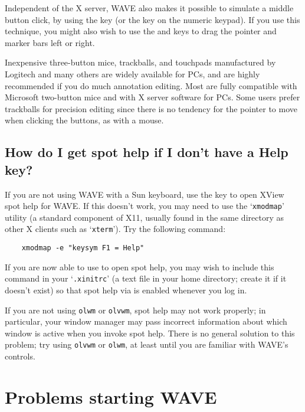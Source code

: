 \documentclass[twoside]{book}
\newcommand{\keycap}[1]{\cornersize{.5}\Ovalbox{\small\sf #1}}
\newcommand{\WAVE}{{\sf WAVE}\xspace}
\begin{document}
Independent of the X server, \WAVE{} also makes it possible to simulate a
middle button click, by using the \keycap{F2} key (or the \keycap{5} key
on the numeric keypad).  If you use this technique, you might also wish to
use the \keycap{F3} and \keycap{F4} keys to drag the pointer and marker bars
left or right.

Inexpensive three-button mice, trackballs, and touchpads manufactured
by Logitech and many others are widely available for PCs, and are
highly recommended if you do much annotation editing.  Most are fully
compatible with Microsoft two-button mice and with X server software
for PCs.  Some users prefer trackballs for precision editing since
there is no tendency for the pointer to move when clicking the
buttons, as with a mouse.

\subsection{How do I get spot help if I don't have a {\sf Help} key?}

\label{faq:no-help-key}
If you are not using \WAVE{} with a Sun keyboard, use the \keycap{F1}
key to open XView
spot help for \WAVE{}.  If this doesn't work, you
may need to use the `{\tt xmodmap}' utility (a standard component of
X11, usually found in the same directory as other X clients such as
`{\tt xterm}').  Try the following command:

\begin{verbatim}
	xmodmap -e "keysym F1 = Help"
\end{verbatim}

If you are now able to use \keycap{F1} to open spot help, you may wish
to include this command in your `{\tt .xinitrc}' (a text file in your
home directory; create it if it doesn't exist) so that spot help via
\keycap{F1} is enabled whenever you log in.

If you are not using {\tt olwm} or {\tt olvwm},
spot help may not work
properly; in particular, your window manager may pass incorrect
information about which window is active when you invoke spot help.
There is no general solution to this problem; try using {\tt olvwm} or
{\tt olwm}, at least until you are familiar with \WAVE{}'s controls.

\section{Problems starting \WAVE{}}
\end{document}
